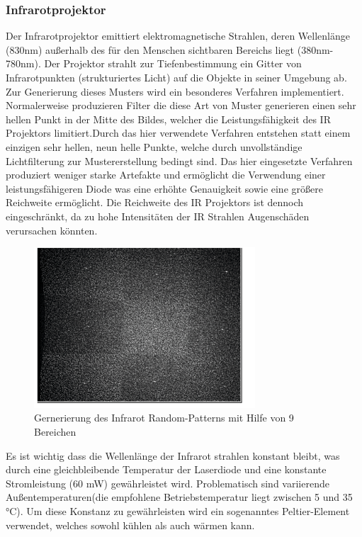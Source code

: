\subsubsection{Infrarotprojektor}
Der Infrarotprojektor emittiert elektromagnetische Strahlen, deren Wellenlänge (830nm) außerhalb des für den Menschen sichtbaren Bereichs liegt (380nm-780nm).
Der Projektor strahlt zur Tiefenbestimmung ein Gitter von Infrarotpunkten (strukturiertes Licht) auf die Objekte in seiner Umgebung ab. 
Zur Generierung dieses Musters wird ein besonderes Verfahren implementiert.
Normalerweise produzieren Filter die diese Art von Muster generieren einen sehr hellen Punkt in der Mitte des Bildes, welcher die Leistungsfähigkeit des IR Projektors limitiert.Durch das hier verwendete Verfahren entstehen statt einem einzigen sehr hellen, neun helle Punkte, welche durch unvollständige Lichtfilterung zur Mustererstellung bedingt sind. Das hier eingesetzte Verfahren produziert weniger starke Artefakte und ermöglicht die Verwendung einer leistungsfähigeren Diode was eine erhöhte Genauigkeit sowie eine größere Reichweite ermöglicht. Die Reichweite des IR Projektors ist dennoch eingeschränkt, da zu hohe Intensitäten der IR Strahlen Augenschäden verursachen könnten.
\begin{figure}
  \vspace{-20pt}
  \begin{center}
        \includegraphics[height=6cm]{Res/9_Dots.png}
  \end{center}
  \vspace{-20pt}
  \caption{Gernerierung des Infrarot Random-Patterns mit Hilfe von 9 Bereichen }
  \vspace{-10pt}
\end{figure}
Es ist wichtig dass die Wellenlänge der Infrarot strahlen konstant bleibt, was durch eine gleichbleibende Temperatur der Laserdiode und eine konstante Stromleistung (60 mW) gewährleistet wird. Problematisch sind variierende Außentemperaturen(die empfohlene Betriebstemperatur  liegt zwischen 5 und 35 °C). Um diese Konstanz zu gewährleisten wird ein sogenanntes  Peltier-Element verwendet, welches sowohl kühlen als auch wärmen kann.\\
